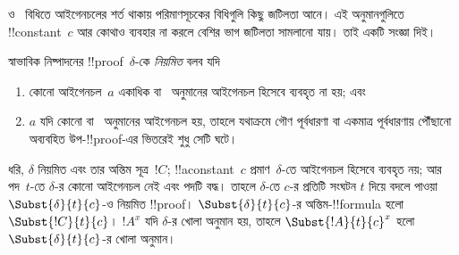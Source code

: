 \documentclass[../../../include/open-logic-section]{subfiles}
\begin{document}


\Elim{\lexists} ও~\Intro{\lforall} বিধিতে আইগেনচলের শর্ত
থাকায় পরিমাণসূচকের বিধিগুলি কিছু জটিলতা আনে। এই
অনুমানগুলিতে !!{constant}~$c$ আর কোথাও ব্যবহার না করলে
বেশির ভাগ জটিলতা সামলানো যায়। তাই একটি সংজ্ঞা দিই।

\begin{defn}
স্বাভাবিক নিষ্পাদনের !!{proof}~$\delta$-কে \emph{নিয়মিত}
বলব যদি
\begin{enumerate}
  \item কোনো আইগেনচল~$a$ একাধিক \Elim{\lexists} বা~\Intro{\lforall}
  অনুমানের আইগেনচল হিসেবে ব্যবহৃত না হয়; এবং
  \item $a$ যদি কোনো \Elim{\lexists} বা~\Intro{\lforall}
  অনুমানের আইগেনচল হয়, তাহলে যথাক্রমে গৌণ পূর্বধারণা
  বা একমাত্র পূর্বধারণায় পৌঁছানো অব্যবহিত উপ-!!{proof}-এর
  ভিতরেই শুধু সেটি ঘটে।
\end{enumerate}
\end{defn}

\begin{lem} ধরি, $\delta$ নিয়মিত এবং
তার অন্তিম সূত্র~$!C$; !!a{constant}~$c$ প্রমাণ~$\delta$-তে
আইগেনচল হিসেবে ব্যবহৃত নয়; আর পদ~$t$-তে $\delta$-র
কোনো আইগেনচল নেই এবং পদটি বদ্ধ। তাহলে $\delta$-তে $c$-র প্রতিটি
সংঘটন $t$ দিয়ে বদলে পাওয়া $\Subst{\delta}{t}{c}$-ও
নিয়মিত !!{proof}। $\Subst{\delta}{t}{c}$-র অন্তিম-!!{formula} হলো
$\Subst{!C}{t}{c}$। $!A^x$ যদি $\delta$-র খোলা অনুমান হয়,
তাহলে $\Subst{!A}{t}{c}^x$ হলো
$\Subst{\delta}{t}{c}$-র খোলা অনুমান।
\end{lem}
\end{document}
